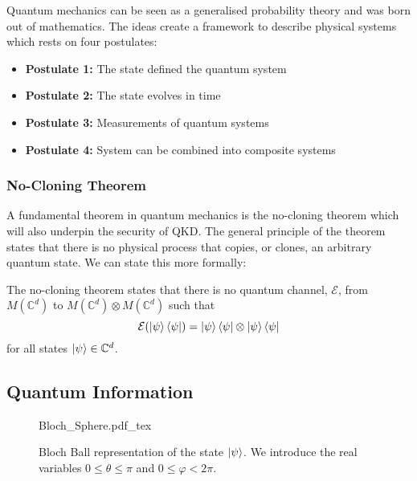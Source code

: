 Quantum mechanics can be seen as a generalised probability theory and was born out of mathematics. The ideas create a framework to describe physical systems which rests on four postulates:

\begin{itemize}
	\item[] \textbf{Postulate 1:} The state defined the quantum system
	\item[] \textbf{Postulate 2:} The state evolves in time
	\item[] \textbf{Postulate 3:} Measurements of quantum systems
	\item[] \textbf{Postulate 4:} System can be combined into composite systems
\end{itemize}

\subsubsection{No-Cloning Theorem}

A fundamental theorem in quantum mechanics is the {\color{bristol-red} no-cloning theorem} which will also underpin the security of \ac{QKD}. The general principle of the theorem states that there is no physical process that copies, or clones, an arbitrary quantum state. We can state this more formally:

\begin{theorem}
	 The no-cloning theorem states that there is no quantum channel, $\mathcal{E}$, from $M(\mathbb{C}^d)$ to $M(\mathbb{C}^d) \otimes M(\mathbb{C}^d)$ such that
	 \begin{equation*}
	 	\mathcal{E}(\ket{\psi}\bra{\psi}) = \ket{\psi}\bra{\psi} \otimes \ket{\psi}\bra{\psi}
	 \end{equation*}
	 for all states $\ket{\psi} \in \mathbb{C}^d$.
\end{theorem}

\subsection{Quantum Information}

\begin{figure}
	\centering
	\def\svgwidth{0.4\textwidth}
   	{Bloch_Sphere.pdf_tex}
   	\caption[Bloch sphere representation of a qubit]{Bloch Ball representation of the state $\ket{\psi}$. We introduce the real variables $0\le\theta\le\pi$ and $0\le\varphi<2\pi$.}
   	\label{fig:bloch}
\end{figure}

